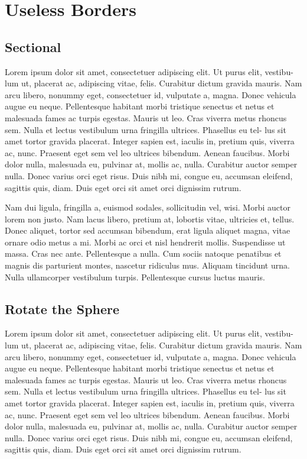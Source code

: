 \chapter{Useless Borders}

\section{Sectional}
Lorem ipsum dolor sit amet, consectetuer adipiscing elit. Ut purus elit, vestibu-
lum ut, placerat ac, adipiscing vitae, felis. Curabitur dictum gravida mauris.
Nam arcu libero, nonummy eget, consectetuer id, vulputate a, magna. Donec
vehicula augue eu neque. Pellentesque habitant morbi tristique senectus et
netus et malesuada fames ac turpis egestas. Mauris ut leo. Cras viverra metus
rhoncus sem. Nulla et lectus vestibulum urna fringilla ultrices. Phasellus eu tel-
lus sit amet tortor gravida placerat. Integer sapien est, iaculis in, pretium quis,
viverra ac, nunc. Praesent eget sem vel leo ultrices bibendum. Aenean faucibus.
Morbi dolor nulla, malesuada eu, pulvinar at, mollis ac, nulla. Curabitur auctor
semper nulla. Donec varius orci eget risus. Duis nibh mi, congue eu, accumsan
eleifend, sagittis quis, diam. Duis eget orci sit amet orci dignissim rutrum.

Nam dui ligula, fringilla a, euismod sodales, sollicitudin vel, wisi. Morbi auctor
lorem non justo. Nam lacus libero, pretium at, lobortis vitae, ultricies et, tellus.
Donec aliquet, tortor sed accumsan bibendum, erat ligula aliquet magna, vitae
ornare odio metus a mi. Morbi ac orci et nisl hendrerit mollis. Suspendisse ut
massa. Cras nec ante. Pellentesque a nulla. Cum sociis natoque penatibus et
magnis dis parturient montes, nascetur ridiculus mus. Aliquam tincidunt urna.
Nulla ullamcorper vestibulum turpis. Pellentesque cursus luctus mauris.

\section{Rotate the Sphere}
Lorem ipsum dolor sit amet, consectetuer adipiscing elit. Ut purus elit, vestibu-
lum ut, placerat ac, adipiscing vitae, felis. Curabitur dictum gravida mauris.
Nam arcu libero, nonummy eget, consectetuer id, vulputate a, magna. Donec
vehicula augue eu neque. Pellentesque habitant morbi tristique senectus et
netus et malesuada fames ac turpis egestas. Mauris ut leo. Cras viverra metus
rhoncus sem. Nulla et lectus vestibulum urna fringilla ultrices. Phasellus eu tel-
lus sit amet tortor gravida placerat. Integer sapien est, iaculis in, pretium quis,
viverra ac, nunc. Praesent eget sem vel leo ultrices bibendum. Aenean faucibus.
Morbi dolor nulla, malesuada eu, pulvinar at, mollis ac, nulla. Curabitur auctor
semper nulla. Donec varius orci eget risus. Duis nibh mi, congue eu, accumsan
eleifend, sagittis quis, diam. Duis eget orci sit amet orci dignissim rutrum.

